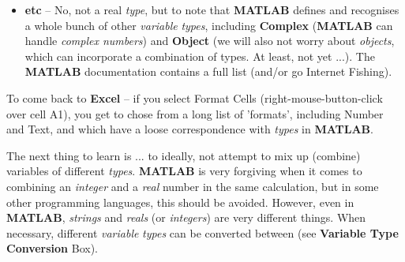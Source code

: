 \documentclass{tufte-book} %
\begin{document}
\begin{itemize}
\item \textbf{etc} -- No, not a real \textit{type}, but to note that \textbf{MATLAB} defines and recognises a whole bunch of other \textit{variable} \textit{types}, including \textbf{Complex} (\textbf{MATLAB} can handle \textit{complex numbers}) and \textbf{Object} (we will also not worry about \textit{objects}, which can incorporate a combination of types. At least, not yet ...). The \textbf{MATLAB} documentation contains a full list (and/or go Internet Fishing).

\end{itemize}

To come back to \textbf{Excel} -- if you select \textsf{Format Cells} (right-mouse-button-click over cell A1), you get to chose from a long list of 'formats', including \textsf{Number} and \textsf{Text}, and which have a loose correspondence with \textit{types} in \textbf{MATLAB}.

The next thing to learn is ... to ideally, not attempt to mix up (combine) variables of different \textit{types}. \textbf{MATLAB} is very forgiving when it comes to combining an \textit{integer} and a \textit{real} number in the same calculation, but in some other programming languages, this should be avoided.
However, even in \textbf{MATLAB}, \textit{strings} and \textit{reals} (or \textit{integers}) are very different things. When necessary, different \textit{variable} \textit{types} can be converted between (see \textbf{Variable Type Conversion} Box).
\end{document}
